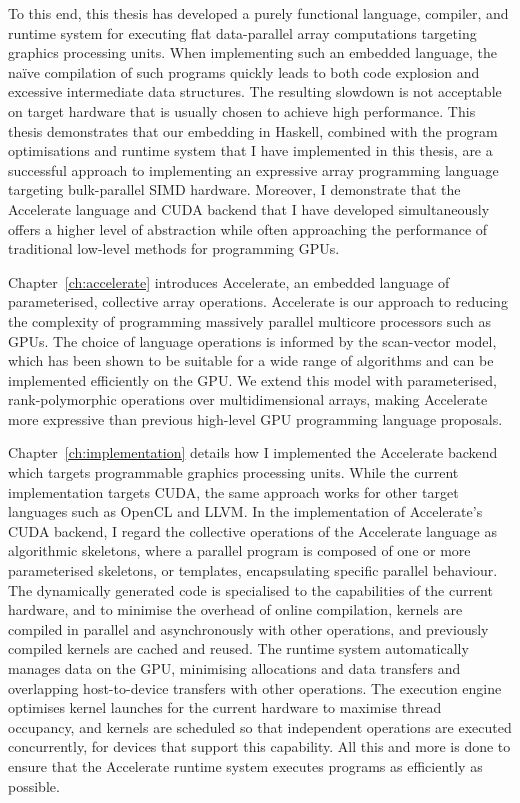 
To this end, this thesis has developed a purely functional language, compiler,
and runtime system for executing flat data-parallel array computations targeting
graphics processing units. When implementing such an embedded language, the
na\"ive compilation of such programs quickly leads to both code explosion and
excessive intermediate data structures. The resulting slowdown is not acceptable
on target hardware that is usually chosen to achieve high performance. This
thesis demonstrates that our embedding in Haskell, combined with the program
optimisations and runtime system that I have implemented in this thesis, are a
successful approach to implementing an expressive array programming language
targeting bulk-parallel SIMD hardware. Moreover, I demonstrate that the
Accelerate language and CUDA backend that I have developed simultaneously offers
a higher level of abstraction while often approaching the performance of
traditional low-level methods for programming GPUs.

Chapter~\ref{ch:accelerate} introduces Accelerate, an embedded language of
parameterised, collective array operations. Accelerate is our approach to
reducing the complexity of programming massively parallel multicore processors
such as GPUs. The choice of language operations is informed by the scan-vector
model, which has been shown to be suitable for a wide range of algorithms and
can be implemented efficiently on the GPU\@. We extend this model with
parameterised, rank-polymorphic operations over multidimensional arrays, making
Accelerate more expressive than previous high-level GPU programming language
proposals.

Chapter~\ref{ch:implementation} details how I implemented the Accelerate backend
which targets programmable graphics processing units. While the current
implementation targets CUDA, the same approach works for other target languages
such as OpenCL and LLVM. In the implementation of Accelerate's CUDA backend, I
regard the collective operations of the Accelerate language as algorithmic
skeletons, where a parallel program is composed of one or more parameterised
skeletons, or templates, encapsulating specific parallel behaviour. The
dynamically generated code is specialised to the capabilities of the current
hardware, and to minimise the overhead of online compilation, kernels are
compiled in parallel and asynchronously with other operations, and previously
compiled kernels are cached and reused. The runtime system automatically manages
data on the GPU, minimising allocations and data transfers and overlapping
host-to-device transfers with other operations. The execution engine optimises
kernel launches for the current hardware to maximise thread occupancy, and
kernels are scheduled so that independent operations are executed concurrently,
for devices that support this capability. All this and more is done to ensure
that the Accelerate runtime system executes programs as efficiently as possible.

